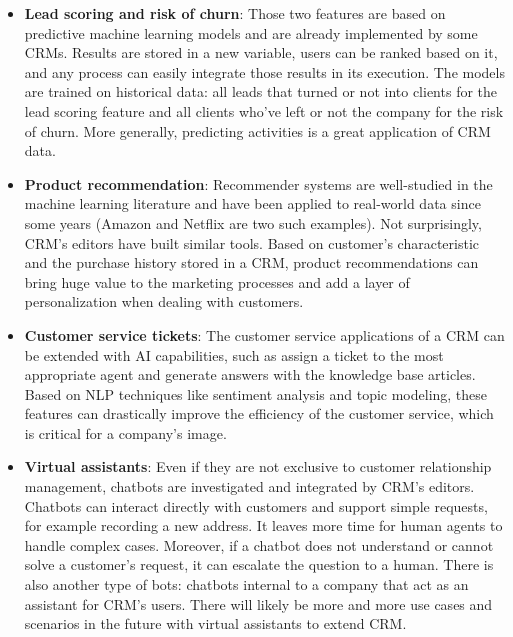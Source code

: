 \begin{itemize}
    \item \textbf{Lead scoring and risk of churn}: Those two features are based on predictive machine learning models and are already implemented by some CRMs. Results are stored in a new variable, users can be ranked based on it, and any process can easily integrate those results in its execution. The models are trained on historical data: all leads that turned or not into clients for the lead scoring feature and all clients who've left or not the company for the risk of churn. More generally, predicting activities is a great application of CRM data.
    \item \textbf{Product recommendation}: Recommender systems are well-studied in the machine learning literature and have been applied to real-world data since some years (Amazon and Netflix are two such examples). Not surprisingly, CRM's editors have built similar tools. Based on customer's characteristic and the purchase history stored in a CRM, product recommendations can bring huge value to the marketing processes and add a layer of personalization when dealing with customers.
    \item \textbf{Customer service tickets}: The customer service applications of a CRM can be extended with AI capabilities, such as assign a ticket to the most appropriate agent and generate answers with the knowledge base articles. Based on NLP techniques like sentiment analysis and topic modeling, these features can drastically improve the efficiency of the customer service, which is critical for a company's image.
    \item \textbf{Virtual assistants}: Even if they are not exclusive to customer relationship management, chatbots are investigated and integrated by CRM's editors. Chatbots can interact directly with customers and support simple requests, for example recording a new address. It leaves more time for human agents to handle complex cases. Moreover, if a chatbot does not understand or cannot solve a customer's request, it can escalate the question to a human. There is also another type of bots: chatbots internal to a company that act as an assistant for CRM's users. There will likely be more and more use cases and scenarios in the future with virtual assistants to extend CRM.
\end{itemize}

